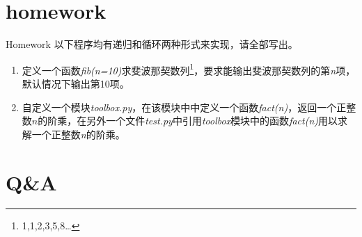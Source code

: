 \documentclass{beamer}
\begin{document}
\section{homework}
\begin{frame}{Homework}
以下程序均有递归和循环两种形式来实现，请全部写出。
\begin{enumerate}
\item
定义一个函数\textit{fib(n=10)}求斐波那契数列\footnote{1,1,2,3,5,8…}，要求能输出斐波那契数列的第\textit{n}项，默认情况下输出第10项。
\item
自定义一个模块\textit{toolbox.py}，在该模块中中定义一个函数\textit{fact(n)}，返回一个正整数$n$的阶乘，在另外一个文件\textit{test.py}中引用\textit{toolbox}模块中的函数\textit{fact(n)}用以求解一个正整数\textit{n}的阶乘。
\end{enumerate}
\end{frame}
\section{Q\&A}
\begin{frame}
\end{frame}


%
\end{document}
